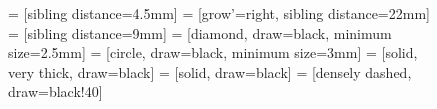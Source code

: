 
\vspace{-.5cm}
\begin{figure}[h!]
  \centering
   = [sibling distance=4.5mm]
   = [grow'=right, sibling distance=22mm]
   = [sibling distance=9mm]
   = [diamond, draw=black, minimum size=2.5mm]
   = [circle, draw=black, minimum size=3mm]
   = [solid, very thick, draw=black]
   = [solid, draw=black]
   = [densely dashed, draw=black!40]
\qquad
\end{figure}
